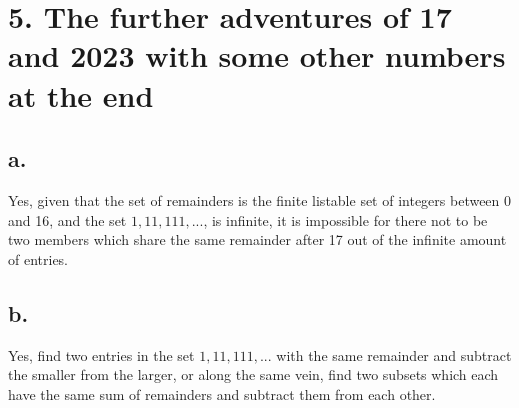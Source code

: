 \documentclass{article}
\begin{document}
\section*{5. The further adventures of 17 and 2023 with some other numbers at the end}
\subsection*{a. }
Yes, given that the set of remainders is the finite listable set of integers between 0 and 16, and the set ${1, 11, 111, ...}$, is infinite, it is impossible for there not to be two members which share the same remainder after 17 out of the infinite amount of entries.
\subsection*{b.}
Yes, find two entries in the set ${1, 11, 111, ...}$ with the same remainder and subtract the smaller from the larger, or along the same vein, find two subsets which each have the same sum of remainders and subtract them from each other. 
\end{document}
